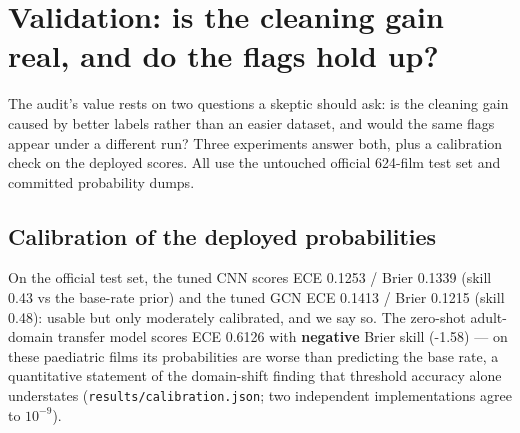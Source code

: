 
\section{Validation: is the cleaning gain real, and do the flags hold up?}
\label{sec:validation}
The audit's value rests on two questions a skeptic should ask: is the
cleaning gain caused by better labels rather than an easier dataset, and
would the same flags appear under a different run? Three experiments
answer both, plus a calibration check on the deployed scores. All use the
untouched official 624-film test set and committed probability dumps.

\subsection{Calibration of the deployed probabilities}
On the official test set, the tuned CNN scores ECE 0.1253 /
Brier 0.1339 (skill 0.43
vs the base-rate prior) and the tuned GCN ECE 0.1413 /
Brier 0.1215 (skill 0.48): usable but only
moderately calibrated, and we say so. The zero-shot adult-domain transfer
model scores ECE 0.6126 with \textbf{negative} Brier skill
(-1.58) --- on these paediatric films its
probabilities are worse than predicting the base rate, a quantitative
statement of the domain-shift finding that threshold accuracy alone
understates (\texttt{results/calibration.json}; two independent
implementations agree to $10^{-9}$).

